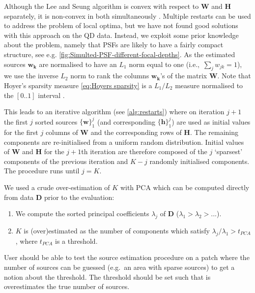 Although the Lee and Seung algorithm is convex with respect to $\bm{W}$ and $\bm{H}$ separately, it is non-convex in both simultaneously \cite{Lee2001}. Multiple restarts can be used to address the problem of local optima, but we have not found good solutions with this approach on the QD data. Instead, we exploit some prior knowledge about the problem, namely that PSFs are likely to have a fairly compact structure, see e.g. \autoref{fig:Simulted-PSF-different-focal-depths}. As the estimated sources $\bm{w_{k}}$ are normalised to have an $L_1$ norm equal to one (i.e.,\ $\sum_{j}w_{jk}=1$), we use the inverse $L_2$ norm to rank the columns $\bm{w_{k}}$'s of the matrix $\bm{W}$. Note that Hoyer's sparsity measure \autoref{eq:Hoyers sparsity} is a $L_{1}/L_{2}$ measure normalised to the $[0..1]$ interval \cite{Kim2008}. 

This leads to an iterative algorithm (see \autoref{alg:restarts}) where on iteration $j+1$ the first $j$ sorted sources $\{ \bm{w} \}_{1}^{j}$ (and corresponding $\{ \bm{h} \}_{1}^{j}$) are used as initial values for the first $j$ columns of $\bm{W}$ and the corresponding rows of $\bm{H}$. The remaining components are re-initialised from a uniform random distribution. Initial values of $\bm{W}$ and $\bm{H}$ for the $j+1$th iteration are therefore composed of the $j$ `sparsest' components of the previous iteration and $K-j$ randomly initialised components. The procedure runs until $j=K$. 

We used a crude over-estimation of $K$ with PCA which can be computed directly from data $\bm{D}$ prior to the evaluation: 
%
\begin{enumerate}
	\item
	We compute the sorted principal coefficients $\lambda_{j}$ of $\bm{D}$ ($\lambda_{1}>\lambda_{2}>...$). 
	\item
	$K$ is (over)estimated as the number of components which satisfy $\lambda_{j}/\lambda_{1}>t_{\unit{PCA}}$, where $t_{\unit{PCA}}$ is a threshold. 
\end{enumerate}
%
User should be able to test the source estimation procedure on a patch where the number of sources can be guessed (e.g.\ an area with sparse sources) to get a notion about the threshold. The threshold should be set such that is overestimates the true number of sources.

